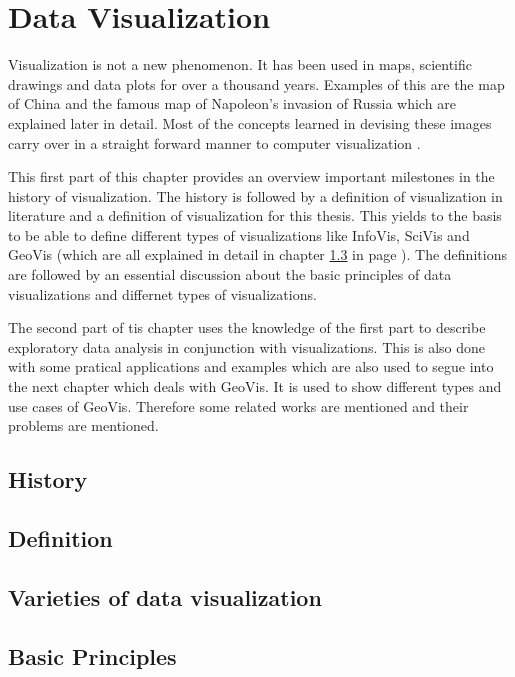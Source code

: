 \section{Data Visualization}
Visualization is not a new phenomenon. It has been used in maps, scientific drawings and data plots for over a thousand years. Examples of this are the map of China and the famous map of Napoleon's invasion of Russia which are explained later in detail. Most of the concepts learned in devising these images carry over in a straight forward manner to computer visualization .

This first part of this chapter provides an overview important milestones in the history of visualization. The history is followed by a definition of visualization in literature and a definition of visualization for this thesis. This yields to the basis to be able to define different types of visualizations like \ac{InfoVis}, \ac{SciVis} and \ac{GeoVis} (which are all explained in detail in chapter \ref{s:definitions-types} in page \pageref{s:definitions-types}). The definitions are followed by an essential discussion about the basic principles of data visualizations and differnet types of visualizations.

The second part of tis chapter uses the knowledge of the first part to describe exploratory data analysis in conjunction with visualizations. This is also done with some pratical applications and examples which are also used to segue into the next chapter which deals with \ac{GeoVis}. It is used to show different types and use cases of \ac{GeoVis}. Therefore some related works are mentioned and their problems are mentioned.

\subsection{History}


\subsection{Definition}

\subsection{Varieties of data visualization}
\label{s:definitions-types}

\subsection{Basic Principles}
\label{s:basics}

